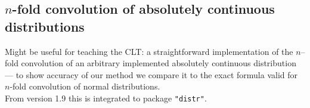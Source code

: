 \documentclass[11pt]{article}
\newcommand{\pkg}[1]{{\tt "#1"}}
\begin{document}
\subsection{$n$-fold convolution of absolutely continuous distributions}\label{exe10}
\begin{small}
Might be useful for teaching the CLT: a straightforward implementation of the
$n$--fold convolution of an
arbitrary implemented absolutely continuous distribution --- to show accuracy
of our method we compare it to the
exact formula valid for $n$-fold convolution of normal distributions.\\
From version 1.9 this is integrated to package \pkg{distr}.
\end{small}
\end{document}
